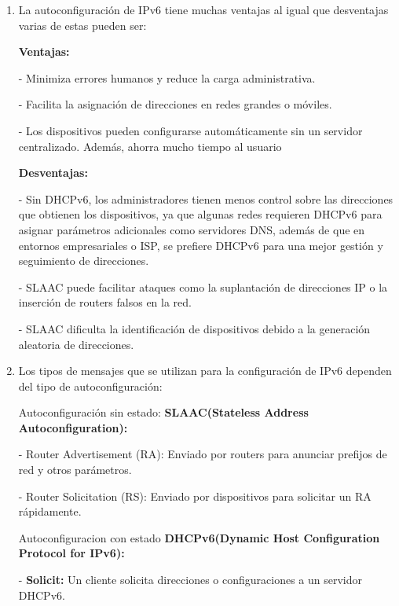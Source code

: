 \documentclass[12pt]{article}
\begin{document}
 \begin{enumerate}
 	\item La autoconfiguración de IPv6 tiene muchas ventajas al igual que desventajas varias de estas pueden ser:
 	
 	\textbf{Ventajas:}
 	
 \begin{center}
 		-	Minimiza errores humanos y reduce la carga administrativa.
 		
 	-	Facilita la asignación de direcciones en redes grandes o móviles.
 		
 	-	Los dispositivos pueden configurarse automáticamente sin un servidor centralizado. Además, ahorra mucho tiempo al usuario
 \end{center}
 		
 		\textbf{Desventajas:}
 		
 	\begin{center}
 		-	 Sin DHCPv6, los administradores tienen menos control sobre las direcciones que obtienen los dispositivos, ya que algunas redes requieren DHCPv6 para asignar parámetros adicionales como servidores DNS, además de que en entornos empresariales o ISP, se prefiere DHCPv6 para una mejor gestión y seguimiento de direcciones.
 		
 	-	 SLAAC puede facilitar ataques como la suplantación de direcciones IP o la inserción de routers falsos en la red.
 		
 	- SLAAC dificulta la identificación de dispositivos debido a la generación aleatoria de direcciones.
 	\end{center}
 		
 		
 	\item Los tipos de mensajes que se utilizan  para la configuración de IPv6 dependen del tipo de autoconfiguración:
 	
 	Autoconfiguración sin estado: \textbf{SLAAC(Stateless Address Autoconfiguration):}
 	
 	\begin{center}
 		-	 Router Advertisement (RA): Enviado por routers para anunciar prefijos de red y otros parámetros.
 	
 	- 	 Router Solicitation (RS): Enviado por dispositivos para solicitar un RA rápidamente.
 	\end{center}
 	
 	Autoconfiguracion con estado \textbf{DHCPv6(Dynamic Host Configuration Protocol for IPv6):}
 	
 \begin{center}
 		-	\textbf{Solicit:} Un cliente solicita direcciones o configuraciones a un servidor DHCPv6.
 	

\end{center}
\end{enumerate}
\end{document}

